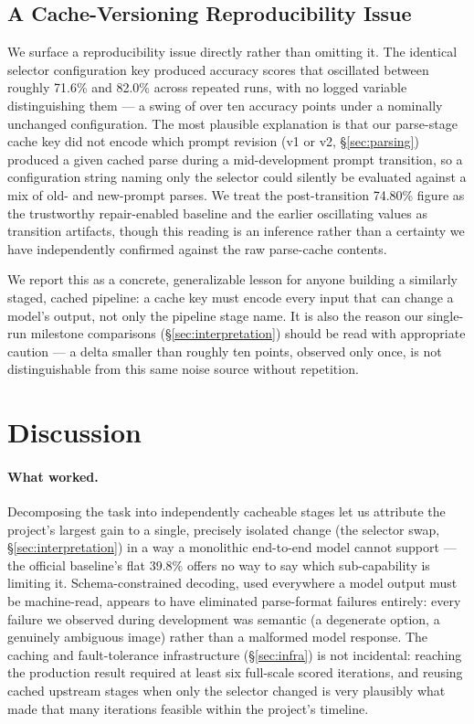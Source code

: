 \documentclass[11pt]{article}
\begin{document}
\subsection{A Cache-Versioning Reproducibility Issue}
\label{sec:reproducibility}

We surface a reproducibility issue directly rather than omitting it. The identical selector configuration key produced accuracy scores that oscillated between roughly 71.6\% and 82.0\% across repeated runs, with no logged variable distinguishing them --- a swing of over ten accuracy points under a nominally unchanged configuration. The most plausible explanation is that our parse-stage cache key did not encode which prompt revision (v1 or v2, \S\ref{sec:parsing}) produced a given cached parse during a mid-development prompt transition, so a configuration string naming only the selector could silently be evaluated against a mix of old- and new-prompt parses. We treat the post-transition 74.80\% figure as the trustworthy repair-enabled baseline and the earlier oscillating values as transition artifacts, though this reading is an inference rather than a certainty we have independently confirmed against the raw parse-cache contents.

We report this as a concrete, generalizable lesson for anyone building a similarly staged, cached pipeline: a cache key must encode every input that can change a model's output, not only the pipeline stage name. It is also the reason our single-run milestone comparisons (\S\ref{sec:interpretation}) should be read with appropriate caution --- a delta smaller than roughly ten points, observed only once, is not distinguishable from this same noise source without repetition.

\section{Discussion}
\label{sec:discussion}

\paragraph{What worked.} Decomposing the task into independently cacheable stages let us attribute the project's largest gain to a single, precisely isolated change (the selector swap, \S\ref{sec:interpretation}) in a way a monolithic end-to-end model cannot support --- the official baseline's flat 39.8\% offers no way to say which sub-capability is limiting it. Schema-constrained decoding, used everywhere a model output must be machine-read, appears to have eliminated parse-format failures entirely: every failure we observed during development was semantic (a degenerate option, a genuinely ambiguous image) rather than a malformed model response. The caching and fault-tolerance infrastructure (\S\ref{sec:infra}) is not incidental: reaching the production result required at least six full-scale scored iterations, and reusing cached upstream stages when only the selector changed is very plausibly what made that many iterations feasible within the project's timeline.
\end{document}
